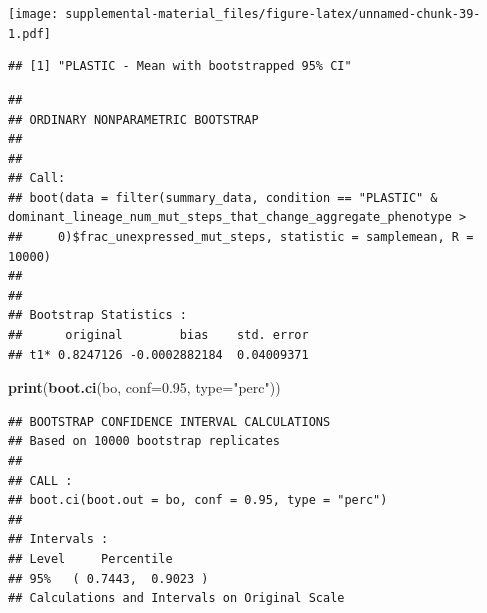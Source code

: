 \documentclass[]{book}
\newenvironment{Shaded}{\begin{snugshade}}{\end{snugshade}}
\newcommand{\DataTypeTok}[1]{\textcolor[rgb]{0.13,0.29,0.53}{#1}}
\newcommand{\DecValTok}[1]{\textcolor[rgb]{0.00,0.00,0.81}{#1}}
\newcommand{\FloatTok}[1]{\textcolor[rgb]{0.00,0.00,0.81}{#1}}
\newcommand{\KeywordTok}[1]{\textcolor[rgb]{0.13,0.29,0.53}{\textbf{#1}}}
\newcommand{\NormalTok}[1]{#1}
\newcommand{\OperatorTok}[1]{\textcolor[rgb]{0.81,0.36,0.00}{\textbf{#1}}}
\newcommand{\StringTok}[1]{\textcolor[rgb]{0.31,0.60,0.02}{#1}}
\begin{document}
\texttt{[image: supplemental-material\_files/figure-latex/unnamed-chunk-39-1.pdf]}

\begin{Shaded}
\end{Shaded}

\begin{verbatim}
## [1] "PLASTIC - Mean with bootstrapped 95% CI"
\end{verbatim}

\begin{Shaded}
\end{Shaded}

\begin{verbatim}
## 
## ORDINARY NONPARAMETRIC BOOTSTRAP
## 
## 
## Call:
## boot(data = filter(summary_data, condition == "PLASTIC" & dominant_lineage_num_mut_steps_that_change_aggregate_phenotype > 
##     0)$frac_unexpressed_mut_steps, statistic = samplemean, R = 10000)
## 
## 
## Bootstrap Statistics :
##      original        bias    std. error
## t1* 0.8247126 -0.0002882184  0.04009371
\end{verbatim}

\begin{Shaded}
\begin{Highlighting}[]
\KeywordTok{print}\NormalTok{(}\KeywordTok{boot.ci}\NormalTok{(bo, }\DataTypeTok{conf=}\FloatTok{0.95}\NormalTok{, }\DataTypeTok{type=}\StringTok{"perc"}\NormalTok{))}
\end{Highlighting}
\end{Shaded}

\begin{verbatim}
## BOOTSTRAP CONFIDENCE INTERVAL CALCULATIONS
## Based on 10000 bootstrap replicates
## 
## CALL : 
## boot.ci(boot.out = bo, conf = 0.95, type = "perc")
## 
## Intervals : 
## Level     Percentile     
## 95%   ( 0.7443,  0.9023 )  
## Calculations and Intervals on Original Scale
\end{verbatim}
\end{document}
